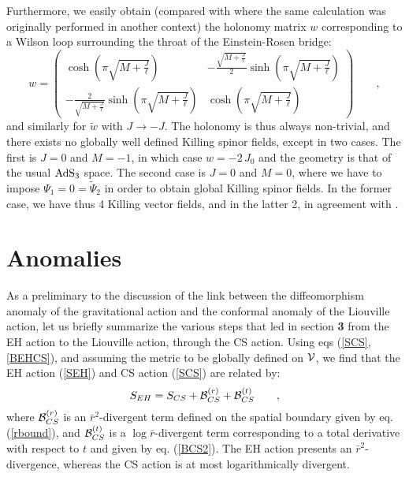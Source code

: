 \documentclass[a4paper,10pt]{article}
\begin{document}
Furthermore, we easily obtain (compared with \cite{Ma} where the same
calculation was originally performed in another context)
the holonomy matrix $w$
corresponding to a Wilson loop surrounding the throat of the 
Einstein-Rosen bridge:
\begin{equation}
w= \left(\begin{array}{cc} 
\cosh \left (  \pi  \sqrt{M+\frac J \ell}\right) &   
- \frac { \sqrt{M+\frac J \ell}}2 
\sinh \left (\pi  \sqrt{M+\frac J \ell}\right) \\
- \frac 2 { \sqrt{M+\frac J \ell}}  
\sinh\left ( \pi  \sqrt{M+\frac J \ell}\right) & 
\cosh \left( \pi  \sqrt{M+\frac J \ell}\right)
 \end{array}\right) \qquad ,     
\end{equation}
and similarly for $\tilde w$ with
$J \rightarrow -J$. The holonomy is thus always non-trivial, and 
there exists no globally well defined Killing spinor fields, except
in two cases. The first is
$J=0$ and $M=-1$, in which case
$w=-2 \, J_0 $ and the geometry is
that of the usual  $\rm AdS_3$ space. The second case is
$J=0$ and $M=0$, where we have to impose $\Psi_1=0=\tilde \Psi_2$ in
order to obtain global Killing spinor fields.
In the former case, we have thus 4 Killing vector fields, and in the latter 2,
in agreement with \cite{CH}.

\section{Anomalies}

As a preliminary to the discussion of the link between the diffeomorphism
anomaly of the gravitational action and the conformal anomaly of the
Liouville action, let us briefly summarize the various steps that led 
in section
{\bf 3} from the EH action to  the Liouville action, 
through the CS action. Using eqs (\ref{SCS}, \ref{BEHCS}), 
and assuming the metric to be globally defined on $\cal V$, we find that
the EH action (\ref{SEH}) and CS action (\ref{SCS}) are related by:
\begin{equation}
\label{SEHSCS}
S_{EH}=S_{CS}+{\cal B}_{CS}^{(r)} +{\cal B}_{CS}^{(t)} \qquad ,
\end{equation}
where ${\cal B}_{CS}^{(r)}$ is an $\bar r^2$-divergent term defined on the 
spatial boundary given by eq. (\ref{rbound}), and ${\cal B}_{CS}^{(t)}$
is a $\log{\bar r}$-divergent term corresponding to a total derivative 
with respect to $t$ and given by eq. (\ref{BCS2}).
The EH action presents an $\bar r^2$-divergence, whereas the CS action 
is at most logarithmically divergent.
\end{document}
